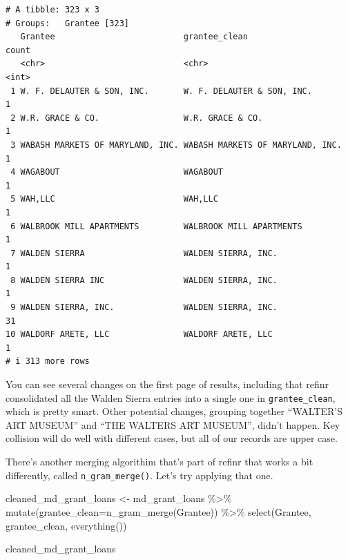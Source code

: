 \documentclass[
  letterpaper,
  DIV=11,
  numbers=noendperiod]{scrreprt}
\newenvironment{Shaded}{\begin{snugshade}}{\end{snugshade}}
\newcommand{\AttributeTok}[1]{\textcolor[rgb]{0.40,0.45,0.13}{#1}}
\newcommand{\FunctionTok}[1]{\textcolor[rgb]{0.28,0.35,0.67}{#1}}
\newcommand{\NormalTok}[1]{\textcolor[rgb]{0.00,0.23,0.31}{#1}}
\newcommand{\OtherTok}[1]{\textcolor[rgb]{0.00,0.23,0.31}{#1}}
\newcommand{\SpecialCharTok}[1]{\textcolor[rgb]{0.37,0.37,0.37}{#1}}
\begin{document}
\begin{verbatim}
# A tibble: 323 x 3
# Groups:   Grantee [323]
   Grantee                          grantee_clean                    count
   <chr>                            <chr>                            <int>
 1 W. F. DELAUTER & SON, INC.       W. F. DELAUTER & SON, INC.           1
 2 W.R. GRACE & CO.                 W.R. GRACE & CO.                     1
 3 WABASH MARKETS OF MARYLAND, INC. WABASH MARKETS OF MARYLAND, INC.     1
 4 WAGABOUT                         WAGABOUT                             1
 5 WAH,LLC                          WAH,LLC                              1
 6 WALBROOK MILL APARTMENTS         WALBROOK MILL APARTMENTS             1
 7 WALDEN SIERRA                    WALDEN SIERRA, INC.                  1
 8 WALDEN SIERRA INC                WALDEN SIERRA, INC.                  1
 9 WALDEN SIERRA, INC.              WALDEN SIERRA, INC.                 31
10 WALDORF ARETE, LLC               WALDORF ARETE, LLC                   1
# i 313 more rows
\end{verbatim}

You can see several changes on the first page of results, including that
refinr consolidated all the Walden Sierra entries into a single one in
\texttt{grantee\_clean}, which is pretty smart. Other potential changes,
grouping together ``WALTER'S ART MUSEUM'' and ``THE WALTERS ART
MUSEUM'', didn't happen. Key collision will do well with different
cases, but all of our records are upper case.

There's another merging algorithim that's part of refinr that works a
bit differently, called \texttt{n\_gram\_merge()}. Let's try applying
that one.

\begin{Shaded}
\begin{Highlighting}[]
\NormalTok{cleaned\_md\_grant\_loans }\OtherTok{\textless{}{-}}\NormalTok{ md\_grant\_loans }\SpecialCharTok{\%\textgreater{}\%}
  \FunctionTok{mutate}\NormalTok{(}\AttributeTok{grantee\_clean=}\FunctionTok{n\_gram\_merge}\NormalTok{(Grantee)) }\SpecialCharTok{\%\textgreater{}\%}
  \FunctionTok{select}\NormalTok{(Grantee, grantee\_clean, }\FunctionTok{everything}\NormalTok{())}

\NormalTok{cleaned\_md\_grant\_loans}
\end{Highlighting}
\end{Shaded}
\end{document}

